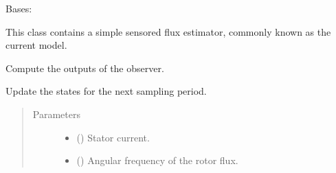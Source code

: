 \documentclass[letterpaper,10pt,english]{sphinxmanual}
\begin{document}

\begin{fulllineitems}
\label{\detokenize{control.im:control.im.vector.CurrentModelEstimator}}
\pysigstartsignatures
{}
\pysigstopsignatures
\sphinxAtStartPar
Bases: 

\sphinxAtStartPar
This class contains a simple sensored flux estimator, commonly known as
the current model.

\begin{fulllineitems}
\label{\detokenize{control.im:control.im.vector.CurrentModelEstimator.output}}
\pysigstartsignatures
{}
\pysigstopsignatures
\sphinxAtStartPar
Compute the outputs of the observer.

\end{fulllineitems}


\begin{fulllineitems}
\label{\detokenize{control.im:control.im.vector.CurrentModelEstimator.update}}
\pysigstartsignatures
{}
\pysigstopsignatures
\sphinxAtStartPar
Update the states for the next sampling period.
\begin{quote}\begin{description}
\item[{Parameters}] \leavevmode\begin{itemize}
\item {} 
\sphinxAtStartPar
{} () \textendash{} Stator current.

\item {} 
\sphinxAtStartPar
{} () \textendash{} Angular frequency of the rotor flux.

\end{itemize}

\end{description}\end{quote}

\end{fulllineitems}


\end{fulllineitems}
\end{document}
